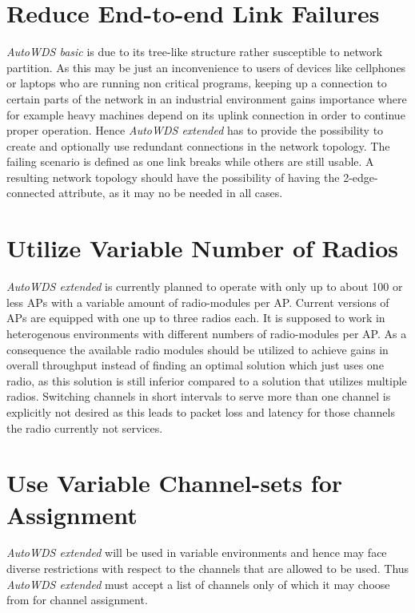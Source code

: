  \section{Reduce End-to-end Link Failures}
  \label{regendtoend}
  \textit{AutoWDS basic} is due to its tree-like structure rather susceptible to network partition.
  As this may be just an inconvenience to users of devices like cellphones or laptops who are running non critical programs, 
  keeping up a connection to certain parts of the network in an industrial environment gains importance where for example heavy machines depend on its uplink connection in order 
  to continue proper operation. Hence \textit{AutoWDS extended} has to provide the possibility to create and optionally use
  redundant connections in the network topology. The failing scenario is defined as one link breaks while others are still usable.
  A resulting network topology should have the possibility of having the 2-edge-connected attribute, as it may no be needed in all cases.
  
  \section{Utilize Variable Number of Radios}
  \label{utilvarnumradio}
  \textit{AutoWDS extended} is currently planned to operate with only up to about 100 or less APs with a variable amount of radio-modules per \ac{AP}.
  Current versions of APs are equipped with one up to three radios each. It is supposed to work in heterogenous environments with 
  different numbers of radio-modules per \ac{AP}. As a consequence the available radio modules 
  should be utilized to achieve gains in overall throughput instead of finding an optimal solution which just uses one radio, as this solution is
  still inferior compared to a solution that utilizes multiple radios.
  Switching channels in short intervals to serve more than one channel is explicitly not desired as this leads to packet loss and latency for those channels the radio
  currently not services.
  
  \section{Use Variable Channel-sets for Assignment}
  \textit{AutoWDS extended} will be used in variable environments and hence may face diverse restrictions with respect to the channels that are allowed to be used.
  Thus \textit{AutoWDS extended} must accept a list of channels only of which it may choose from for channel assignment.
  
